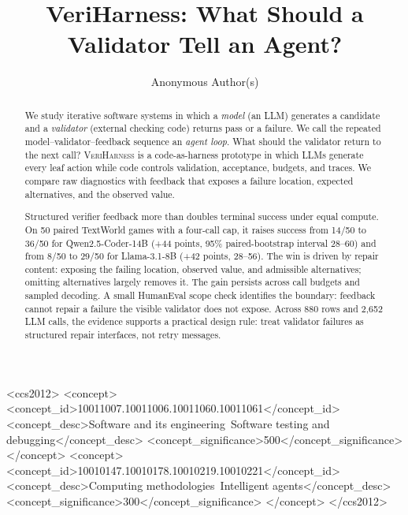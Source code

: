 \documentclass[sigconf,review,anonymous]{acmart}
\newcommand{\vh}{\textsc{VeriHarness}\xspace}
\begin{document}
\setlength{\emergencystretch}{1em}

\title{VeriHarness: What Should a Validator Tell an Agent?}

\author{Anonymous Author(s)}

\begin{abstract}
We study iterative software systems in which a \emph{model} (an LLM) generates a
candidate and a \emph{validator} (external checking code) returns pass or a
failure. We call the repeated model--validator--feedback sequence an
\emph{agent loop}. What should the validator return to the next call? \vh is a
code-as-harness prototype in which LLMs generate every leaf action while code
controls validation, acceptance, budgets, and traces.
We compare raw diagnostics with feedback that exposes a failure location,
expected alternatives, and the observed value.

Structured verifier feedback more than doubles terminal success under equal
compute. On 50 paired TextWorld games with a four-call cap, it raises success
from 14/50 to 36/50 for Qwen2.5-Coder-14B (+44 points, 95\%
paired-bootstrap interval 28--60) and from 8/50 to 29/50 for Llama-3.1-8B
(+42 points, 28--56). The win is driven by repair content: exposing the failing
location, observed value, and admissible alternatives; omitting alternatives
largely removes it. The gain persists across call budgets and sampled decoding.
A small HumanEval scope check identifies the boundary: feedback cannot repair a
failure the visible validator does not expose. Across 880 rows and 2,652 LLM
calls, the evidence supports a practical design rule: treat validator failures
as structured repair interfaces, not retry messages.
\end{abstract}

\begin{CCSXML}
<ccs2012>
 <concept>
  <concept_id>10011007.10011006.10011060.10011061</concept_id>
  <concept_desc>Software and its engineering~Software testing and debugging</concept_desc>
  <concept_significance>500</concept_significance>
 </concept>
 <concept>
  <concept_id>10010147.10010178.10010219.10010221</concept_id>
  <concept_desc>Computing methodologies~Intelligent agents</concept_desc>
  <concept_significance>300</concept_significance>
 </concept>
</ccs2012>
\end{CCSXML}

\end{document}
